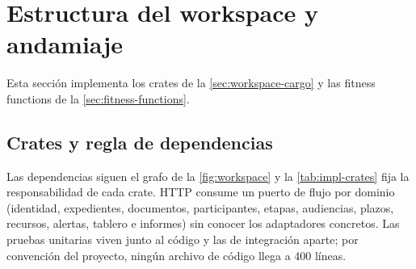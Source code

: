 
\section{Estructura del workspace y andamiaje}\label{sec:impl-workspace}

Esta sección implementa los crates de la \cref{sec:workspace-cargo} y las fitness functions de la \cref{sec:fitness-functions}.

\subsection{Crates y regla de dependencias}

Las dependencias siguen el grafo de la \cref{fig:workspace} y la \cref{tab:impl-crates} fija la responsabilidad de cada crate. HTTP consume un puerto de flujo por dominio (identidad, expedientes, documentos, participantes, etapas, audiencias, plazos, recursos, alertas, tablero e informes) sin conocer los adaptadores concretos. Las pruebas unitarias viven junto al código y las de integración aparte; por convención del proyecto, ningún archivo de código llega a 400 líneas.

